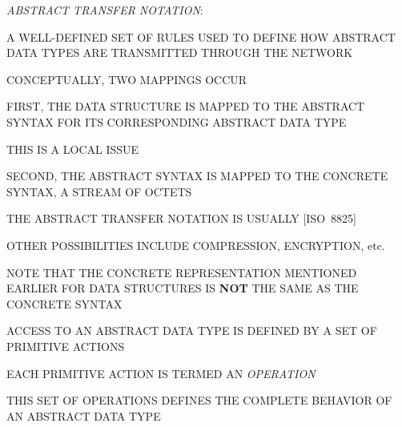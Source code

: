 \begin{bwslide}

\begin{nrtc}
\item	\emph{ABSTRACT TRANSFER NOTATION}:
    \begin{nrtc}
    \item	A WELL-DEFINED SET OF RULES USED TO DEFINE HOW ABSTRACT DATA
		TYPES ARE TRANSMITTED THROUGH THE NETWORK
    \end{nrtc}
\end{nrtc}
\end{bwslide}


\begin{bwslide}

\begin{nrtc}
\item	CONCEPTUALLY, TWO MAPPINGS OCCUR

\item	FIRST, THE DATA STRUCTURE IS MAPPED TO THE ABSTRACT SYNTAX FOR ITS
	CORRESPONDING ABSTRACT DATA TYPE
    \begin{nrtc}
    \item	THIS IS A LOCAL ISSUE
    \end{nrtc}

\item	SECOND, THE ABSTRACT SYNTAX IS MAPPED TO THE CONCRETE SYNTAX,
	A STREAM OF OCTETS
    \begin{nrtc}
    \item	THE ABSTRACT TRANSFER NOTATION IS USUALLY [ISO~8825]

    \item	OTHER POSSIBILITIES INCLUDE COMPRESSION, ENCRYPTION, etc.
    \end{nrtc}

\item	NOTE THAT THE CONCRETE REPRESENTATION MENTIONED EARLIER FOR
	DATA STRUCTURES IS {\bf NOT\/} THE SAME AS THE CONCRETE SYNTAX
\end{nrtc}
\end{bwslide}


\begin{bwslide}

\begin{nrtc}
\item	ACCESS TO AN ABSTRACT DATA TYPE IS DEFINED BY A SET OF PRIMITIVE
	ACTIONS

\item	EACH PRIMITIVE ACTION IS TERMED AN \emph{OPERATION}

\item	THIS SET OF OPERATIONS DEFINES THE COMPLETE BEHAVIOR OF AN ABSTRACT
	DATA TYPE
\end{nrtc}
\end{bwslide}


